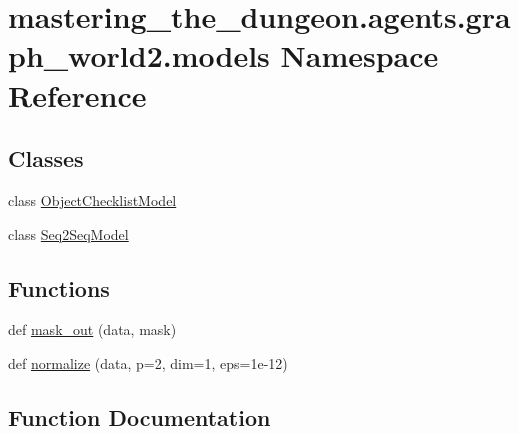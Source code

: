 \hypertarget{namespacemastering__the__dungeon_1_1agents_1_1graph__world2_1_1models}{}\section{mastering\+\_\+the\+\_\+dungeon.\+agents.\+graph\+\_\+world2.\+models Namespace Reference}
\label{namespacemastering__the__dungeon_1_1agents_1_1graph__world2_1_1models}
\subsection*{Classes}
\begin{DoxyCompactItemize}
\item 
class \hyperlink{classmastering__the__dungeon_1_1agents_1_1graph__world2_1_1models_1_1ObjectChecklistModel}{Object\+Checklist\+Model}
\item 
class \hyperlink{classmastering__the__dungeon_1_1agents_1_1graph__world2_1_1models_1_1Seq2SeqModel}{Seq2\+Seq\+Model}
\end{DoxyCompactItemize}
\subsection*{Functions}
\begin{DoxyCompactItemize}
\item 
def \hyperlink{namespacemastering__the__dungeon_1_1agents_1_1graph__world2_1_1models_a4dbf79ea4237c7a8a156cc7a4667a30a}{mask\+\_\+out} (data, mask)
\item 
def \hyperlink{namespacemastering__the__dungeon_1_1agents_1_1graph__world2_1_1models_a61f1e78d293d29b242ffa643c7ad45f9}{normalize} (data, p=2, dim=1, eps=1e-\/12)
\end{DoxyCompactItemize}


\subsection{Function Documentation}
\mbox{\label{namespacemastering__the__dungeon_1_1agents_1_1graph__world2_1_1models_a4dbf79ea4237c7a8a156cc7a4667a30a}} 
